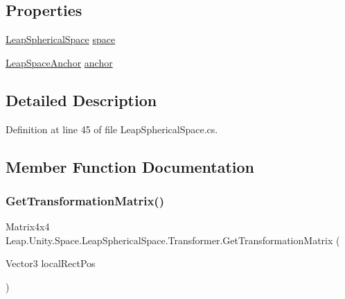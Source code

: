 \subsection*{Properties}
\begin{DoxyCompactItemize}
\item 
\mbox{\hyperlink{class_leap_1_1_unity_1_1_space_1_1_leap_spherical_space}{Leap\+Spherical\+Space}} \mbox{\hyperlink{class_leap_1_1_unity_1_1_space_1_1_leap_spherical_space_1_1_transformer_a61cb8c82630ced9054828f14b1129f2d}{space}}
\item 
\mbox{\hyperlink{class_leap_1_1_unity_1_1_space_1_1_leap_space_anchor}{Leap\+Space\+Anchor}} \mbox{\hyperlink{class_leap_1_1_unity_1_1_space_1_1_leap_spherical_space_1_1_transformer_a074822bd99def96e0a6b73b3b7aa3b56}{anchor}}
\end{DoxyCompactItemize}


\subsection{Detailed Description}


Definition at line 45 of file Leap\+Spherical\+Space.\+cs.



\subsection{Member Function Documentation}
\mbox{\label{class_leap_1_1_unity_1_1_space_1_1_leap_spherical_space_1_1_transformer_aad315845425b24d3b09c62c49a7093ca}} 
\subsubsection{\texorpdfstring{GetTransformationMatrix()}{GetTransformationMatrix()}}
{\footnotesize\ttfamily Matrix4x4 Leap.\+Unity.\+Space.\+Leap\+Spherical\+Space.\+Transformer.\+Get\+Transformation\+Matrix (\begin{DoxyParamCaption}\item[{Vector3}]{local\+Rect\+Pos }\end{DoxyParamCaption})}



